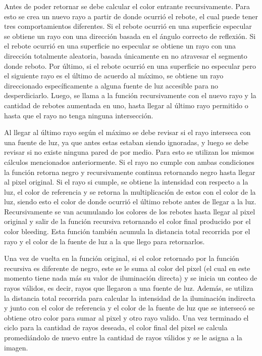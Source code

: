 \documentclass[conference]{IEEEtran}
\begin{document}
Antes de poder retornar se debe calcular el color entrante recursivamente. Para esto se crea un nuevo rayo a partir de donde ocurrió el rebote, el cual puede tener tres comportamientos diferentes. Si el rebote ocurrió en una superficie especular se obtiene un rayo con una dirección basada en el ángulo correcto de reflexión. Si el rebote ocurrió en una superficie no especular se obtiene un rayo con una dirección totalmente aleatoria, basada únicamente en no atravesar el segmento donde reboto. Por último, si el rebote ocurrió en una superficie no especular pero el siguiente rayo es el último de acuerdo al máximo, se obtiene un rayo direccionado específicamente a alguna fuente de luz accesible para no desperdiciarlo. Luego, se llama a la función recursivamente con el nuevo rayo y la cantidad de rebotes aumentada en uno, hasta llegar al último rayo permitido o hasta que el rayo no tenga ninguna intersección. 

Al llegar al último rayo según el máximo se debe revisar si el rayo interseca con una fuente de luz, ya que antes estas estaban siendo ignoradas, y luego se debe revisar si no existe ninguna pared de por medio. Para esto se utilizan los mismos cálculos mencionados anteriormente. Si el rayo no cumple con ambas condiciones la función retorna negro y recursivamente continua retornando negro hasta llegar al pixel original. Si el rayo si cumple, se obtiene la intensidad con respecto a la luz, el color de referencia y se retorna la multiplicación de estos con el color de la luz, siendo esto el color de donde ocurrió el último rebote antes de llegar a la luz. Recursivamente se van acumulando los colores de los rebotes hasta llegar al pixel original y salir de la función recursiva retornando el color final producido por el color bleeding. Esta función también acumula la distancia total recorrida por el rayo y el color de la fuente de luz a la que llego para retornarlos.

Una vez de vuelta en la función original, si el color retornado por la función recursiva es diferente de negro, este se le suma al color del pixel (el cual en este momento tiene nada más su valor de iluminación directa) y se inicia un conteo de rayos válidos, es decir, rayos que llegaron a una fuente de luz. Además, se utiliza la distancia total recorrida para calcular la intensidad de la iluminación indirecta y junto con el color de referencia y el color de la fuente de luz que se intersecó se obtiene otro color para sumar al pixel y otro rayo valido. Una vez terminado el ciclo para la cantidad de rayos deseada, el color final del pixel se calcula promediándolo de nuevo entre la cantidad de rayos válidos y se le asigna a la imagen.  
\end{document}
